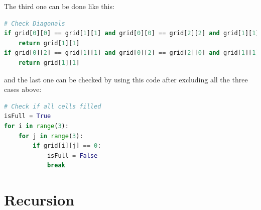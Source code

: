 \documentclass[10pt,xcolor={table,dvipsnames},t]{beamer}
\begin{document}
\begin{frame}[fragile]
  The third one can be done like this:
\begin{lstlisting}[language=python]
# Check Diagonals
if grid[0][0] == grid[1][1] and grid[0][0] == grid[2][2] and grid[1][1] != 0:
    return grid[1][1]
if grid[0][2] == grid[1][1] and grid[0][2] == grid[2][0] and grid[1][1] != 0:
    return grid[1][1]
\end{lstlisting}
and the last one can be checked by using this code after excluding all the three cases above:
\begin{lstlisting}[language=python]
# Check if all cells filled
isFull = True
for i in range(3):
    for j in range(3):
        if grid[i][j] == 0:
            isFull = False
            break
\end{lstlisting}
\end{frame}

\section{Recursion}
\end{document}
